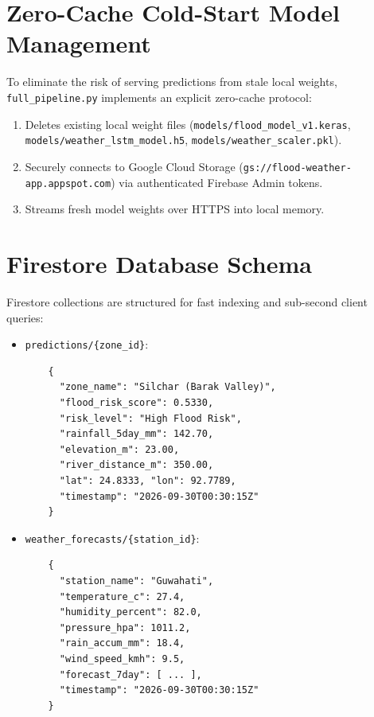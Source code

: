 \documentclass[12pt,a4paper,oneside]{report}
\begin{document}
\section{Zero-Cache Cold-Start Model Management}
To eliminate the risk of serving predictions from stale local weights, \texttt{full\_pipeline.py} implements an explicit zero-cache protocol:
\begin{enumerate}
    \item Deletes existing local weight files (\texttt{models/flood\_model\_v1.keras}, \texttt{models/weather\_lstm\_model.h5}, \texttt{models/weather\_scaler.pkl}).
    \item Securely connects to Google Cloud Storage (\texttt{gs://flood-weather-app.appspot.com}) via authenticated Firebase Admin tokens.
    \item Streams fresh model weights over HTTPS into local memory.
\end{enumerate}

\section{Firestore Database Schema}
Firestore collections are structured for fast indexing and sub-second client queries:
\begin{itemize}
    \item \texttt{predictions/\{zone\_id\}}:
    \begin{verbatim}
    {
      "zone_name": "Silchar (Barak Valley)",
      "flood_risk_score": 0.5330,
      "risk_level": "High Flood Risk",
      "rainfall_5day_mm": 142.70,
      "elevation_m": 23.00,
      "river_distance_m": 350.00,
      "lat": 24.8333, "lon": 92.7789,
      "timestamp": "2026-09-30T00:30:15Z"
    }
    \end{verbatim}
    \item \texttt{weather\_forecasts/\{station\_id\}}:
    \begin{verbatim}
    {
      "station_name": "Guwahati",
      "temperature_c": 27.4,
      "humidity_percent": 82.0,
      "pressure_hpa": 1011.2,
      "rain_accum_mm": 18.4,
      "wind_speed_kmh": 9.5,
      "forecast_7day": [ ... ],
      "timestamp": "2026-09-30T00:30:15Z"
    }
    \end{verbatim}
\end{itemize}

\end{document}
